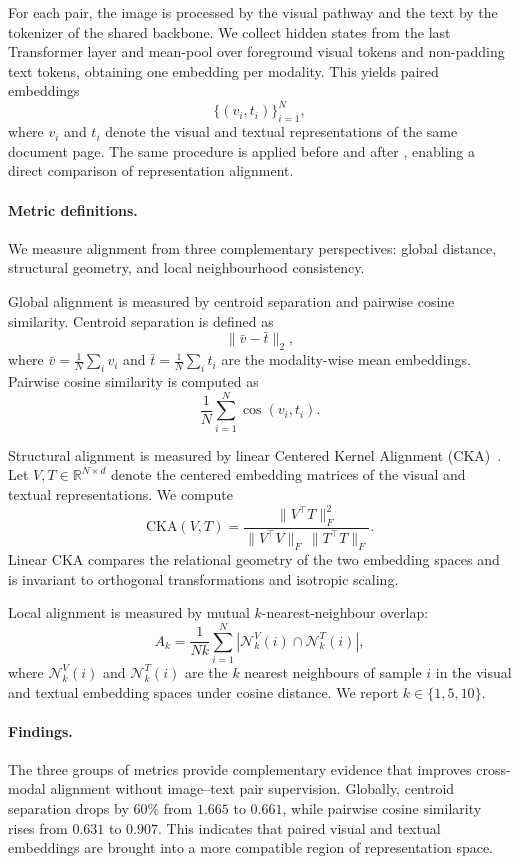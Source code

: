 For each pair, the image is processed by the visual pathway and the text by the tokenizer of the shared backbone. We collect hidden states from the last Transformer layer and mean-pool over foreground visual tokens and non-padding text tokens, obtaining one embedding per modality. This yields paired embeddings
\[
\{(v_i,t_i)\}_{i=1}^{N},
\]
where $v_i$ and $t_i$ denote the visual and textual representations of the same document page. The same procedure is applied before and after \methodname, enabling a direct comparison of representation alignment.

\paragraph{Metric definitions.}
We measure alignment from three complementary perspectives: global distance, structural geometry, and local neighbourhood consistency.

Global alignment is measured by centroid separation and pairwise cosine similarity. Centroid separation is defined as
\[
\|\bar{v}-\bar{t}\|_2,
\]
where $\bar{v}=\frac{1}{N}\sum_i v_i$ and $\bar{t}=\frac{1}{N}\sum_i t_i$ are the modality-wise mean embeddings. Pairwise cosine similarity is computed as
\[
\frac{1}{N}\sum_{i=1}^{N}\cos(v_i,t_i).
\]

Structural alignment is measured by linear Centered Kernel Alignment (CKA)~\citep{kornblith2019similarity}. Let $V,T\in\mathbb{R}^{N\times d}$ denote the centered embedding matrices of the visual and textual representations. We compute
\[
\mathrm{CKA}(V,T)
=
\frac{\|V^\top T\|_F^2}
{\|V^\top V\|_F\,\|T^\top T\|_F}.
\]
Linear CKA compares the relational geometry of the two embedding spaces and is invariant to orthogonal transformations and isotropic scaling.

Local alignment is measured by mutual $k$-nearest-neighbour overlap:
\[
A_k
=
\frac{1}{Nk}
\sum_{i=1}^{N}
\left|
\mathcal{N}^{V}_{k}(i)
\cap
\mathcal{N}^{T}_{k}(i)
\right|,
\]
where $\mathcal{N}^{V}_{k}(i)$ and $\mathcal{N}^{T}_{k}(i)$ are the $k$ nearest neighbours of sample $i$ in the visual and textual embedding spaces under cosine distance. We report $k\in\{1,5,10\}$.

\paragraph{Findings.}
The three groups of metrics provide complementary evidence that \methodname improves cross-modal alignment without image--text pair supervision. Globally, centroid separation drops by $60\%$ from $1.665$ to $0.661$, while pairwise cosine similarity rises from $0.631$ to $0.907$. This indicates that paired visual and textual embeddings are brought into a more compatible region of representation space.

